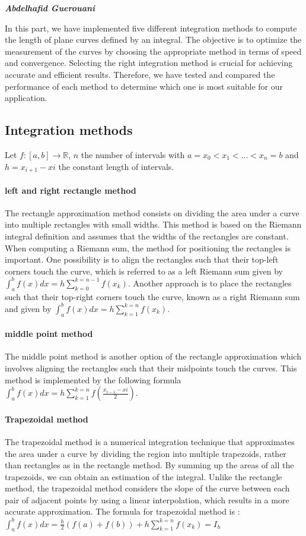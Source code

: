 \large \emph{\textbf{Abdelhafid Guerouani}}

In this part, we have implemented five different integration methods to compute the length of plane curves defined by an integral. The objective is to optimize the measurement of the curves by choosing the appropriate method in terms of speed and convergence.
Selecting the right integration method is crucial for achieving accurate and efficient results. Therefore, we have tested and compared the performance of each method to determine which one is most suitable for our application.
\subsection{Integration methods}
Let $ f : [a,b] \rightarrow \mathbb{R} $, $n$ the number of intervals with $a = x_{0} < x_{1}< ...<x_{n} = b$ and $ h = x_{i+1} -x{i}$ the constant length of intervals.
\paragraph{left and right rectangle method}
The rectangle approximation method consists on dividing the area under a curve into multiple rectangles with small widths. This method is based on the Riemann integral definition and assumes that the widths of the rectangles are constant.
When computing a Riemann sum, the method for positioning the rectangles is important. One possibility is to align the rectangles such that their top-left corners touch the curve, which is referred to as a left Riemann sum given by $\int_{a}^{b}f(x)dx =  h\sum_{k=0}^{k=n-1} f(x_{k}) $.
Another approach is to place the rectangles such that their top-right corners touch the curve, known as a right Riemann sum and given by $\int_{a}^{b}f(x)dx =  h\sum_{k=1}^{k=n} f(x_{k}) $.
\paragraph{middle point method}
The middle point method is another option of the rectangle approximation which involves aligning the rectangles such that their midpoints touch the curves. This method is implemented by the following formula $\int_{a}^{b}f(x)dx =  h\sum_{k=1}^{k=n} f(\frac{x_{i-1} -x{i}}{2})$.
\paragraph{Trapezoidal method}
The trapezoidal method is a numerical integration technique that approximates the area under a curve by dividing the region into multiple trapezoids, rather than rectangles as in the rectangle method. By summing up the areas of all the trapezoids, we can obtain an estimation of the integral. Unlike the rectangle method, the trapezoidal method considers the slope of the curve between each pair of adjacent points by using a linear interpolation, which results in a more accurate approximation. The formula for trapezoidal method is :
$\int_{a}^{b}f(x)dx  = \frac{h}{2}(f(a) + f(b)) + h\sum_{k=1}^{k=n} f(x_{k}) = I_{h}$


